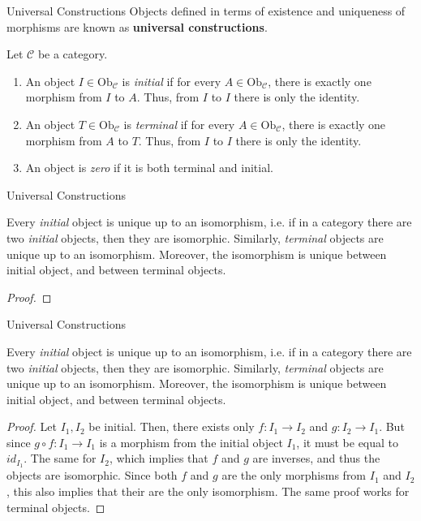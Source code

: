 \documentclass[aspectratio=169,xcolor=dvipsnames,10pt]{beamer}
\theoremstyle{definition}
\begin{document}
\begin{frame}[fragile]{Universal Constructions}
	Objects defined in terms of existence and
	uniqueness of morphisms are known as \textbf{universal constructions}.
	\begin{definition}
		Let $\mathcal C$ be a category.
		\begin{enumerate}[1.]
			\item An object $I \in \text{Ob}_\mathcal C$ is \textit{initial} if for every $A \in \text{Ob}_\mathcal C$,
			      there is exactly one morphism from $I$ to $A$. Thus, from $I$ to $I$ there is only the identity.
			\item An object $T \in \text{Ob}_\mathcal C$ is \textit{terminal} if for every $A \in \text{Ob}_\mathcal C$,
			      there is exactly one morphism from $A$ to $T$. Thus, from $I$ to $I$ there is only the identity.
			\item An object is \textit{zero} if it is both terminal and initial.
		\end{enumerate}
	\end{definition}
\end{frame}


\begin{frame}[fragile]{Universal Constructions}
    \begin{theorem}
        Every \textit{initial} object is unique up to an isomorphism, i.e. if in a category there
        are two \textit{initial} objects, then they are isomorphic.
        Similarly, \textit{terminal} objects are unique up to an isomorphism.
        Moreover, the isomorphism is unique between initial object, and between terminal objects.
    \end{theorem}
    \begin{proof}
    \end{proof}
\end{frame}

\begin{frame}[fragile]{Universal Constructions}
    \begin{theorem}
        Every \textit{initial} object is unique up to an isomorphism, i.e. if in a category there
        are two \textit{initial} objects, then they are isomorphic.
        Similarly, \textit{terminal} objects are unique up to an isomorphism.
        Moreover, the isomorphism is unique between initial object, and between terminal objects.
    \end{theorem}
    \begin{proof}
        Let $I_1, I_2$ be initial. Then, there exists only $f:I_1 \to I_2$ and $g:I_2 \to I_1$.
        But since $g \circ f:I_1 \to I_1$ is a morphism from the initial object $I_1$, it must
        be equal to $id_{I_1}$. The same for $I_2$, which implies that $f$ and $g$ are inverses,
        and thus the objects are isomorphic. Since both $f$ and $g$ are the only morphisms from
        $I_1$ and $I_2$, this also implies that their are the only isomorphism.
        The same proof works for terminal objects.
    \end{proof}
\end{frame}
\end{document}
